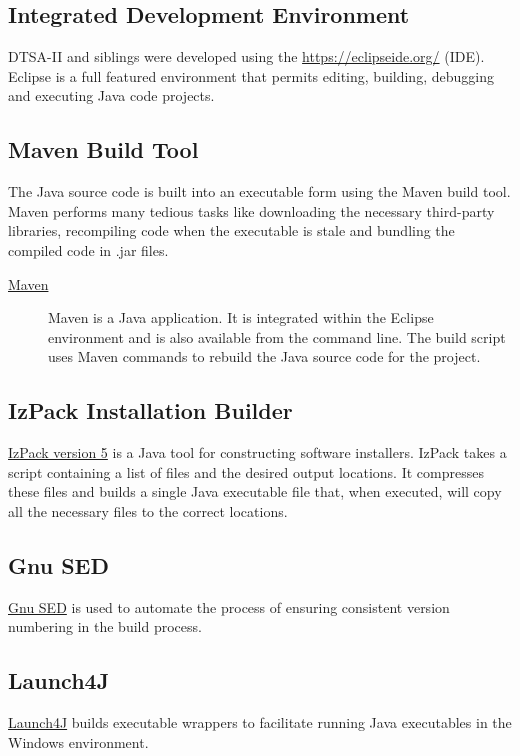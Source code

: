 \documentclass{article}
\begin{document}
\subsection{Integrated Development Environment}
DTSA-II and siblings were developed using the \href{Eclipse Integrated Development Environment}{https://eclipseide.org/} (IDE).  Eclipse is a full featured environment that permits editing, building, debugging and executing Java code projects.
\subsection{Maven Build Tool}
The Java source code is built into an executable form using the Maven build tool.  Maven performs many tedious tasks like downloading the necessary third-party libraries, recompiling code when the executable is stale and bundling the compiled code in .jar files.
\begin{description}
    \item[\href{https://maven.apache.org/}{Maven}]  Maven is a Java application. It is integrated within the Eclipse environment and is also available from the command line.  The build script uses Maven commands to rebuild the Java source code for the project.
\end{description}
\subsection{IzPack Installation Builder}
\href{https://izpack.org/}{IzPack version 5} is a Java tool for constructing software installers.  IzPack takes a script containing a list of files and the desired output locations.  It compresses these files and builds a single Java executable file that, when executed, will copy all the necessary files to the correct locations.
\subsection{Gnu SED}
\href{https://www.gnu.org/software/sed/}{Gnu SED} is used to automate the process of ensuring consistent version numbering in the build process.
\subsection{Launch4J}
\href{https://launch4j.sourceforge.net/}{Launch4J} builds executable wrappers to facilitate running Java executables in the Windows environment.
\end{document}
